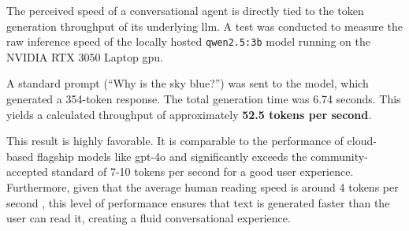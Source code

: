 The perceived speed of a conversational agent is directly tied to the token generation throughput of its underlying \ac{llm}. A test was conducted to measure the raw inference speed of the locally hosted \texttt{qwen2.5:3b} model running on the NVIDIA RTX 3050 Laptop \acs{gpu}.

A standard prompt (``Why is the sky blue?'') was sent to the model, which generated a 354-token response. The total generation time was 6.74 seconds. This yields a calculated throughput of approximately \textbf{52.5 tokens per second}.

This result is highly favorable. It is comparable to the performance of cloud-based flagship models like \acs{gpt}-4o and significantly exceeds the community-accepted standard of 7-10 tokens per second for a good user experience. Furthermore, given that the average human reading speed is around 4 tokens per second \cite{READING-SPEED}, this level of performance ensures that text is generated faster than the user can read it, creating a fluid conversational experience.
